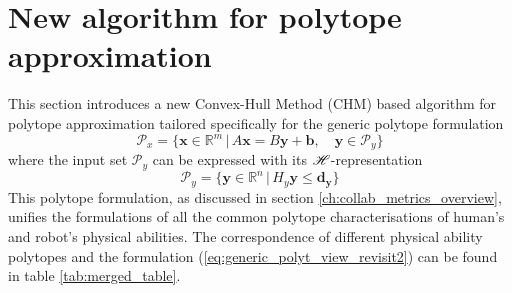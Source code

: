 






\section{New algorithm for polytope approximation}
\label{ch:algorihtm_ichm}

This section introduces a new Convex-Hull Method (CHM) based algorithm for polytope approximation tailored specifically for the generic polytope formulation
\begin{equation}
    \mathcal{P}_x = \big\{ \bm{x}\in \mathbb{R}^{m}\, |\,A\bm{x} = B\bm{y} + \bm{b}, \quad  \bm{y}\in\mathcal{P}_y  \big\}
    \label{eq:generic_polyt_view_revisit2}
\end{equation}
where the input set $\mathcal{P}_y$ can be expressed with its $\mathscr{H}$-representation
\begin{equation}
    \mathcal{P}_y = \big\{ \bm{y}\in \mathbb{R}^{n}\, |\,H_y\bm{y} \leq \bm{d_y}\big\}
    \label{eq:generic_poly_input_set_revisit2}
\end{equation} 
This polytope formulation, as discussed in section \ref{ch:collab_metrics_overview}, unifies the formulations of all the common polytope characterisations of human's and robot's physical abilities. The correspondence of different physical ability polytopes and the formulation (\ref{eq:generic_polyt_view_revisit2}) can be found in table \ref{tab:merged_table}. 

